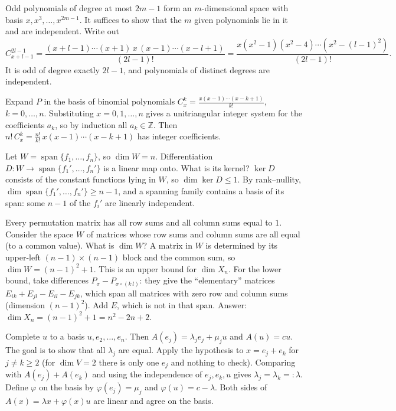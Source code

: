 \documentclass[11pt,a4paper]{article}
\begin{document}

Odd polynomials of degree at most \(2m-1\) form an \(m\)-dimensional space with basis \(x,x^3,\dots,x^{2m-1}\). It suffices to show that the \(m\) given polynomials lie in it and are independent.
Write out\[C_{x+l-1}^{2l-1}=\frac{(x+l-1)\cdots(x+1)\,x\,(x-1)\cdots(x-l+1)}{(2l-1)!}=\frac{x(x^2-1)(x^2-4)\cdots(x^2-(l-1)^2)}{(2l-1)!}.\]It is odd of degree exactly \(2l-1\), and polynomials of distinct degrees are independent.

Expand \(P\) in the basis of binomial polynomials \(C_x^k=\frac{x(x-1)\cdots(x-k+1)}{k!}\), \(k=0,\dots,n\).
Substituting \(x=0,1,\dots,n\) gives a unitriangular integer system for the coefficients \(a_k\), so by induction all \(a_k\in\mathbb Z\). Then \(n!\,C_x^k=\frac{n!}{k!}\,x(x-1)\cdots(x-k+1)\) has integer coefficients.

Let \(W=\operatorname{span}\{f_1,\dots,f_n\}\), so \(\dim W=n\). Differentiation \(D\colon W\to\operatorname{span}\{f_1',\dots,f_n'\}\) is a linear map onto. What is its kernel?
\(\ker D\) consists of the constant functions lying in \(W\), so \(\dim\ker D\le1\). By rank--nullity, \(\dim\operatorname{span}\{f_1',\dots,f_n'\}\ge n-1\), and a spanning family contains a basis of its span: some \(n-1\) of the \(f_i'\) are linearly independent.

Every permutation matrix has all row sums and all column sums equal to \(1\). Consider the space \(W\) of matrices whose row sums and column sums are all equal (to a common value). What is \(\dim W\)?
A matrix in \(W\) is determined by its upper-left \((n-1)\times(n-1)\) block and the common sum, so \(\dim W=(n-1)^2+1\). This is an upper bound for \(\dim X_n\).
For the lower bound, take differences \(P_\sigma-P_{\sigma\circ(k\,l)}\): they give the ``elementary'' matrices \(E_{ik}+E_{jl}-E_{il}-E_{jk}\), which span all matrices with zero row and column sums (dimension \((n-1)^2\)). Add \(E\), which is not in that span. Answer: \(\dim X_n=(n-1)^2+1=n^2-2n+2\).

Complete \(u\) to a basis \(u,e_2,\dots,e_n\). Then \(A(e_j)=\lambda_je_j+\mu_ju\) and \(A(u)=cu\). The goal is to show that all \(\lambda_j\) are equal.
Apply the hypothesis to \(x=e_j+e_k\) for \(j\ne k\ge2\) (for \(\dim V=2\) there is only one \(e_j\) and nothing to check). Comparing with \(A(e_j)+A(e_k)\) and using the independence of \(e_j,e_k,u\) gives \(\lambda_j=\lambda_k=:\lambda\).
Define \(\varphi\) on the basis by \(\varphi(e_j)=\mu_j\) and \(\varphi(u)=c-\lambda\). Both sides of \(A(x)=\lambda x+\varphi(x)u\) are linear and agree on the basis.
\end{document}
